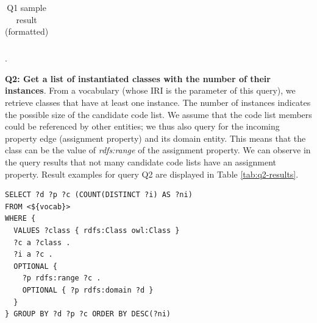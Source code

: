 \begin{table}[h]
\begin{tabular}{|l|l|r|r|}
\end{tabular}
\caption{Q1 sample result (formatted)} \label{tab:q1-results}.
\end{table}

\medskip
\noindent\textbf{Q2: Get a list of instantiated classes with the number of their instances}. From a vocabulary (whose IRI is the parameter of this query), we retrieve classes that have at least one instance. The number of instances indicates the possible size of the candidate code list. We assume that the code list members could be referenced by other entities; we thus also query for the incoming property edge (assignment property) and its domain entity. This means that the class can be the value of \textit{rdfs:range} of the assignment property. We can observe in the query results that not many candidate code lists have an assignment property. %
Result examples for query Q2 are displayed in Table \ref{tab:q2-results}.

\begin{lstlisting}[captionpos=b, caption=Q2 -- Query to get the number of instances of each class in an ontology with their range properties and domain classes,label=lst:sparql2,basicstyle=\small\ttfamily,frame=single]
SELECT ?d ?p ?c (COUNT(DISTINCT ?i) AS ?ni)
FROM <${vocab}>
WHERE {
  VALUES ?class { rdfs:Class owl:Class }
  ?c a ?class .
  ?i a ?c .
  OPTIONAL { 
    ?p rdfs:range ?c . 
    OPTIONAL { ?p rdfs:domain ?d }
  }
} GROUP BY ?d ?p ?c ORDER BY DESC(?ni)
\end{lstlisting}

